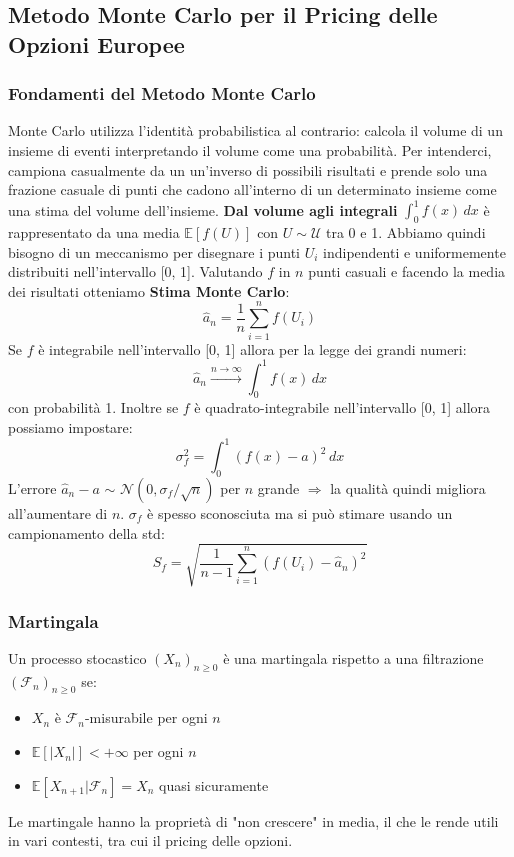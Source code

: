 \documentclass[12pt,a4paper]{report}
\begin{document}
\subsection{Metodo Monte Carlo per il Pricing delle Opzioni Europee}
\subsubsection{Fondamenti del Metodo Monte Carlo}
Monte Carlo utilizza l'identità probabilistica al contrario: calcola il volume di un insieme di eventi interpretando il volume come una probabilità.
\newline
Per intenderci, campiona casualmente da un un'inverso di possibili risultati e prende solo una frazione casuale di punti che cadono all'interno di un determinato insieme come una stima del volume dell'insieme.
\newline
\textbf{Dal volume agli integrali} \newline
\(\int_{0}^{1} f(x) \, dx\) è rappresentato da una media \(\mathbb{E}[f(U)]\) con \(U \sim \mathcal{U}\) tra 0 e 1.
Abbiamo quindi bisogno di un meccanismo per disegnare i punti \(U_i\) indipendenti e uniformemente distribuiti nell'intervallo [0, 1].
\newline
Valutando \(f\) in \(n\) punti casuali e facendo la media dei risultati otteniamo \textbf{Stima Monte Carlo}:
\[
\hat{a}_n = \frac{1}{n} \sum_{i=1}^{n} f(U_i)
\]
Se \(f\) è integrabile nell'intervallo [0, 1] allora per la legge dei grandi numeri:
\[
\hat{a}_n \xrightarrow{n \to \infty} \int_{0}^{1} f(x) \, dx
\]
con probabilità 1.
\newline
Inoltre se \(f\) è quadrato-integrabile nell'intervallo [0, 1] allora possiamo impostare:
\[
    \sigma^2_f = \int_{0}^{1} (f(x) - a)^2 \, dx
\]
L'errore \(\hat{a}_n - a\) \(\sim\) \(\mathcal{N}(0, \sigma_f / \sqrt{n})\) per \(n\) grande \(\Longrightarrow\) la qualità quindi migliora all'aumentare di \(n\).
\newline
\(\sigma_f\) è spesso sconosciuta ma si può stimare usando un campionamento della std:
\[
S_f = \sqrt{\frac{1}{n-1} \sum_{i=1}^{n} (f(U_i) - \hat{a}_n)^2}
\]
\newpage
\subsubsection{Martingala}
Un processo stocastico \((X_n)_{n \geq 0}\) è una martingala rispetto a una filtrazione \((\mathcal{F}_n)_{n \geq 0}\) se:
\begin{itemize}
    \item \(X_n\) è \(\mathcal{F}_n\)-misurabile per ogni \(n\)
    \item \(\mathbb{E}[|X_n|] < +\infty\) per ogni \(n\)
    \item \(\mathbb{E}[X_{n+1} | \mathcal{F}_n] = X_n\) quasi sicuramente
\end{itemize}
Le martingale hanno la proprietà di "non crescere" in media, il che le rende utili in vari contesti, tra cui il pricing delle opzioni.
\end{document}
